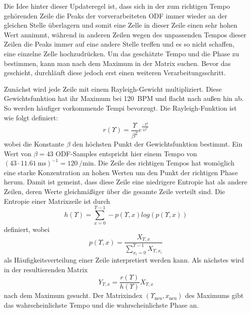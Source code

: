 {{{			%
			Die Idee hinter dieser Updateregel ist,
				dass sich in der zum richtigen Tempo gehörenden Zeile
				die Peaks der vorverarbeiteten ODF immer wieder an der gleichen Stelle überlagern
				und somit eine Zelle in dieser Zeile einen sehr hohen Wert annimmt,
				während in anderen Zeilen
				wegen des unpassenden Tempos dieser Zeilen
				die Peaks immer auf eine andere Stelle treffen
				und es so nicht schaffen,
				eine einzelne Zelle hochzudrücken.
			Um das geschätzte Tempo und die Phase zu bestimmen,
				kann man nach dem Maximum in der Matrix suchen.
			Bevor das geschieht,
				durchläuft diese jedoch erst einen weiteren Verarbeitungsschritt.

			Zunächst wird jede Zeile mit einem Rayleigh-Gewicht multipliziert.
			Diese Gewichtsfunktion hat ihr Maximum bei \SI{120}{\ac{BPM}} und flacht nach au{\ss}en hin ab.
			So werden häufiger vorkommende Tempi bevorzugt.
			Die Rayleigh-Funktion ist wie folgt definiert:
			\begin{equation}
				r(\Upsilon) = \frac{\Upsilon}{\beta^2}e^{\frac{-\Upsilon^2}{2\beta^2}}
			\end{equation}
			wobei die Konstante $\beta$ den höchsten Punkt der Gewichtsfunktion bestimmt.
			Ein Wert von $\beta = 43$ ODF-Samples entspricht hier einem Tempo von
				$(43 \cdot \SI{11.61}{\milli\second})^{-1} = \SI{120}{\per\minute}$.
			Die Zeile des richtigen Tempos hat womöglich eine starke Konzentration an hohen Werten um den Punkt der richtigen Phase herum.
			Damit ist gemeint,
				dass diese Zeile eine niedrigere Entropie hat als andere Zeilen,
				deren Werte gleichmä{\ss}iger über die gesamte Zeile verteilt sind.
			Die Entropie einer Matrixzeile ist durch
				\begin{equation}
					h(\Upsilon) = \sum_{x = 0}^{\Upsilon - 1} -p(\Upsilon, x) log(p(\Upsilon, x))
				\end{equation}
				definiert, wobei
				\begin{equation}
					p(\Upsilon, x) = \frac{X_{\Upsilon, x}}{\sum_{x_i = 0}^{\Upsilon - 1}X_{\Upsilon, x_i}}
				\end{equation}
				als Häufigkeitsverteilung einer Zeile interpretiert werden kann.
			Als nächstes wird in der resultierenden Matrix
				\begin{equation}
					Y_{\Upsilon, x} = \frac{r(\Upsilon)}{h(\Upsilon)}X_{\Upsilon, x}
				\end{equation}
				nach dem Maximum gesucht.
			Der Matrixindex $(\Upsilon_{\text{neu}}, x_{\text{neu}})$ des Maximums gibt das wahrscheinlichste Tempo und die wahrscheinlichste Phase an.

}}}
